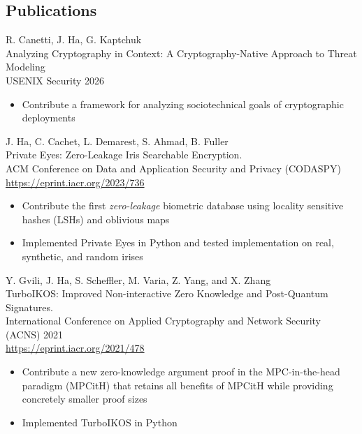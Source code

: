 \documentclass[letterpaper,11pt]{article}
\begin{document}
\subsection*{Publications}
\begin{enumerate}[label={[\arabic*]}, leftmargin=*, align=left]

\item R. Canetti, J. Ha, G. Kaptchuk\\
Analyzing Cryptography in Context: A Cryptography-Native Approach to Threat Modeling\\ 
USENIX Security 2026
\begin{itemize}[nosep]
    \item Contribute a framework for analyzing sociotechnical goals of cryptographic deployments 
\end{itemize}

\item  J. Ha, C. Cachet, L. Demarest, S. Ahmad, B. Fuller \\
Private Eyes: Zero-Leakage Iris Searchable Encryption.\\ 
ACM Conference on Data and Application Security and Privacy (CODASPY) \\
\url{https://eprint.iacr.org/2023/736}
\begin{itemize}[nosep]
    \item Contribute the first \textit{zero-leakage} biometric database using locality sensitive hashes (LSHs) and oblivious maps 
    \item Implemented Private Eyes in Python and tested implementation on real, synthetic, and random irises
\end{itemize}

\item  Y. Gvili, J. Ha, S. Scheffler, M. Varia, Z. Yang, and X. Zhang \\
TurboIKOS: Improved Non-interactive Zero Knowledge and Post-Quantum Signatures.\\
International Conference on Applied Cryptography and Network Security (ACNS) 2021 \\
\url{https://eprint.iacr.org/2021/478}
\begin{itemize}[nosep]
    \item Contribute a new zero-knowledge argument proof in the MPC-in-the-head paradigm (MPCitH) that retains all benefits of MPCitH while providing concretely smaller proof sizes 
    \item Implemented TurboIKOS in Python
\end{itemize}
\end{enumerate}
\end{document}
